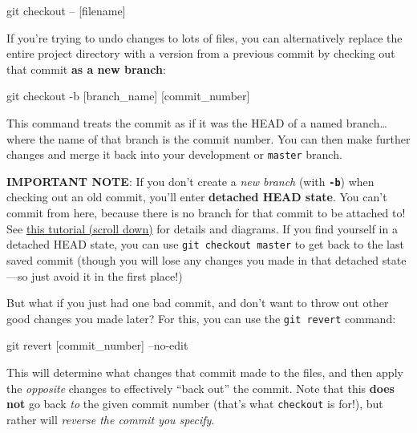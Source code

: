\documentclass[]{book}
\newenvironment{Shaded}{\begin{snugshade}}{\end{snugshade}}
\newcommand{\FunctionTok}[1]{\textcolor[rgb]{0.00,0.00,0.00}{#1}}
\newcommand{\NormalTok}[1]{#1}
\theoremstyle{definition}
\theoremstyle{definition}
\theoremstyle{remark}
\begin{document}
\begin{Shaded}
\begin{Highlighting}[]
\FunctionTok{git}\NormalTok{ checkout -- [filename]}
\end{Highlighting}
\end{Shaded}

If you're trying to undo changes to lots of files, you can alternatively
replace the entire project directory with a version from a previous
commit by checking out that commit \textbf{as a new branch}:

\begin{Shaded}
\begin{Highlighting}[]
\FunctionTok{git}\NormalTok{ checkout -b [branch_name] [commit_number]}
\end{Highlighting}
\end{Shaded}

This command treats the commit as if it was the HEAD of a named
branch\ldots{} where the name of that branch is the commit number. You
can then make further changes and merge it back into your development or
\texttt{master} branch.

\textbf{IMPORTANT NOTE}: If you don't create a \emph{new branch} (with
\textbf{\texttt{-b}}) when checking out an old commit, you'll enter
\textbf{detached HEAD state}. You can't commit from here, because there
is no branch for that commit to be attached to! See
\href{https://www.atlassian.com/git/tutorials/using-branches/git-checkout}{this
tutorial (scroll down)} for details and diagrams. If you find yourself
in a detached HEAD state, you can use \texttt{git\ checkout\ master} to
get back to the last saved commit (though you will lose any changes you
made in that detached state---so just avoid it in the first place!)

But what if you just had one bad commit, and don't want to throw out
other good changes you made later? For this, you can use the
\texttt{git\ revert} command:

\begin{Shaded}
\begin{Highlighting}[]
\FunctionTok{git}\NormalTok{ revert [commit_number] --no-edit}
\end{Highlighting}
\end{Shaded}

This will determine what changes that commit made to the files, and then
apply the \emph{opposite} changes to effectively ``back out'' the
commit. Note that this \textbf{does not} go back \emph{to} the given
commit number (that's what \texttt{checkout} is for!), but rather will
\emph{reverse the commit you specify}.
\end{document}
